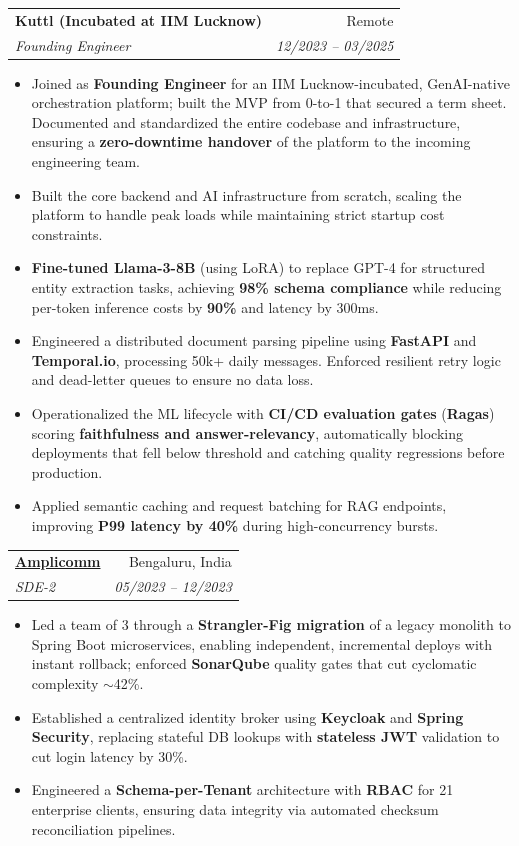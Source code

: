 \documentclass[11pt,a4paper]{article}
\makeatletter
\newcommand{\resumeItem}[1]{
  \item\small{
    {#1 \vspace{-2pt}}
  }
}
\newcommand{\resumeSubheading}[4]{
  \vspace{-1pt}\item
    \begin{tabular*}{0.97\textwidth}[t]{l@{\extracolsep{\fill}}r}
      \textbf{#1} & #2 \\
      \textit{\small#3} & \textit{\small #4} \\
    \end{tabular*}\vspace{-5pt}
}
\newcommand{\resumeItemListStart}{\begin{itemize}[itemsep=2pt, topsep=0pt, partopsep=0pt]}
\newcommand{\resumeItemListEnd}{\end{itemize}\vspace{-5pt}}
\makeatother
\begin{document}
    \resumeSubheading
      {Kuttl (Incubated at IIM Lucknow)}{Remote}
      {Founding Engineer}{12/2023 -- 03/2025}
      \resumeItemListStart
        \resumeItem{Joined as \textbf{Founding Engineer} for an IIM Lucknow-incubated, GenAI-native orchestration platform; built the MVP from 0-to-1 that secured a term sheet. Documented and standardized the entire codebase and infrastructure, ensuring a \textbf{zero-downtime handover} of the platform to the incoming engineering team.}
        \resumeItem{Built the core backend and AI infrastructure from scratch, scaling the platform to handle peak loads while maintaining strict startup cost constraints.}
        \resumeItem{\textbf{Fine-tuned Llama-3-8B} (using LoRA) to replace GPT-4 for structured entity extraction tasks, achieving \textbf{98\% schema compliance} while reducing per-token inference costs by \textbf{90\%} and latency by 300ms.}
        \resumeItem{Engineered a distributed document parsing pipeline using \textbf{FastAPI} and \textbf{Temporal.io}, processing 50k+ daily messages. Enforced resilient retry logic and dead-letter queues to ensure no data loss.}
        \resumeItem{Operationalized the ML lifecycle with \textbf{CI/CD evaluation gates} (\textbf{Ragas}) scoring \textbf{faithfulness and answer-relevancy}, automatically blocking deployments that fell below threshold and catching quality regressions before production.}
        \resumeItem{Applied semantic caching and request batching for RAG endpoints, improving \textbf{P99 latency by 40\%} during high-concurrency bursts.}
      \resumeItemListEnd

    \resumeSubheading
      {\href{https://amplicomm.com/}{Amplicomm}}{Bengaluru, India}
      {SDE-2}{05/2023 -- 12/2023}
      \resumeItemListStart
        \resumeItem{Led a team of 3 through a \textbf{Strangler-Fig migration} of a legacy monolith to Spring Boot microservices, enabling independent, incremental deploys with instant rollback; enforced \textbf{SonarQube} quality gates that cut cyclomatic complexity $\sim$42\%.}
        \resumeItem{Established a centralized identity broker using \textbf{Keycloak} and \textbf{Spring Security}, replacing stateful DB lookups with \textbf{stateless JWT} validation to cut login latency by 30\%.}
        \resumeItem{Engineered a \textbf{Schema-per-Tenant} architecture with \textbf{RBAC} for 21 enterprise clients, ensuring data integrity via automated checksum reconciliation pipelines.}
      \resumeItemListEnd
\end{document}
